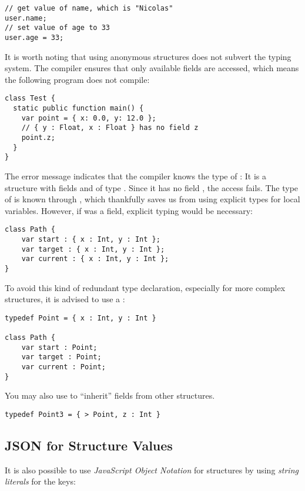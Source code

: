 \begin{lstlisting}
// get value of name, which is "Nicolas"
user.name;
// set value of age to 33
user.age = 33;
\end{lstlisting}
It is worth noting that using anonymous structures does not subvert the typing system. The compiler ensures that only available fields are accessed, which means the following program does not compile:

\begin{lstlisting}
class Test {
  static public function main() {
    var point = { x: 0.0, y: 12.0 };
    // { y : Float, x : Float } has no field z
    point.z;
  }
}
\end{lstlisting}
The error message indicates that the compiler knows the type of : It is a structure with fields  and  of type . Since it has no field , the access fails.
The type of  is known through , which thankfully saves us from using explicit types for local variables. However, if  was a field, explicit typing would be necessary:

\begin{lstlisting}
class Path {
    var start : { x : Int, y : Int };
    var target : { x : Int, y : Int };
    var current : { x : Int, y : Int };
}
\end{lstlisting}
To avoid this kind of redundant type declaration, especially for more complex structures, it is advised to use a :

\begin{lstlisting}
typedef Point = { x : Int, y : Int }

class Path {
    var start : Point;
    var target : Point;
    var current : Point;
}
\end{lstlisting}

You may also use  to ``inherit'' fields from other structures.

\begin{lstlisting}
typedef Point3 = { > Point, z : Int }
\end{lstlisting}


\subsection{JSON for Structure Values}
\label{types-structure-json}

It is also possible to use \emph{JavaScript Object Notation} for structures by using \emph{string literals} for the keys:

